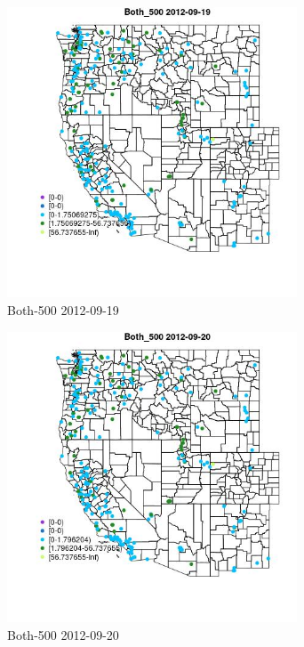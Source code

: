 \begin{figure} 
\centering  
\includegraphics[width=0.77\textwidth]{Code_Outputs/ML_input_report_ML_input_PM25_Step5_part_d_de_duplicated_aves_ML_input_MapObsBoth_5002012-09-19.jpg} 
\caption{\label{fig:ML_input_report_ML_input_PM25_Step5_part_d_de_duplicated_aves_ML_inputMapObsBoth_5002012-09-19}Both-500 2012-09-19} 
\end{figure} 
 

\begin{figure} 
\centering  
\includegraphics[width=0.77\textwidth]{Code_Outputs/ML_input_report_ML_input_PM25_Step5_part_d_de_duplicated_aves_ML_input_MapObsBoth_5002012-09-20.jpg} 
\caption{\label{fig:ML_input_report_ML_input_PM25_Step5_part_d_de_duplicated_aves_ML_inputMapObsBoth_5002012-09-20}Both-500 2012-09-20} 
\end{figure} 
 

